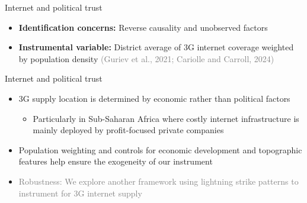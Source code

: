 \documentclass[aspectratio=169,xcolor=dvipsnames]{beamer}
\begin{document}
\begin{frame}{Internet and political trust}
    \vfill
\begin{itemize}
    \item \textcolor[RGB]{220, 10, 10}{\textbf{Identification concerns:}} Reverse causality and unobserved factors
    \vfill
    \item \textcolor[rgb]{0.0,0.6,0.0}{\textbf{Instrumental variable:}} District average of 3G internet coverage weighted by population density \textcolor{gray}{(Guriev et al., 2021; Cariolle and Carroll, 2024)}\\
    \vfill
\end{itemize}

    \center
    


\end{frame}

    \begin{frame}{Internet and political trust}
        \begin{itemize}
\item 
3G supply location is determined by economic rather than political factors
\vfill
\begin{itemize}
    \item 
Particularly in Sub-Saharan Africa where costly internet infrastructure is mainly deployed by profit-focused private companies
\end{itemize}
\vfill
\item Population weighting and controls for economic development and topographic features help ensure the exogeneity of our instrument
\vfill
\item \textcolor{gray}{Robustness: We explore another framework using lightning strike patterns to instrument for 3G internet supply}
\end{itemize}
\end{frame}
\end{document}
